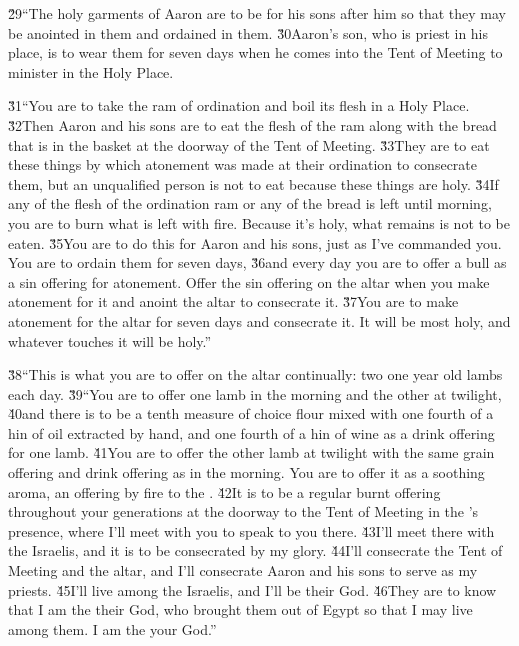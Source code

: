 \v{29}``The holy garments of Aaron are to be for his sons after him so that they may be anointed in them and ordained in them. \v{30}Aaron's son, who is priest in his place, is to wear them for seven days when he comes into the Tent of Meeting to minister in the Holy Place.

\v{31}``You are to take the ram of ordination and boil its flesh in a Holy Place. \v{32}Then Aaron and his sons are to eat the flesh of the ram along with the bread that is in the basket at the doorway of the Tent of Meeting. \v{33}They are to eat these things by which atonement was made at their ordination to consecrate them, but an unqualified person is not to eat because these things are holy. \v{34}If any of the flesh of the ordination ram or any of the bread is left until morning, you are to burn what is left with fire. Because it's holy, what remains is not to be eaten. \v{35}You are to do this for Aaron and his sons, just as I've commanded you. You are to ordain them for seven days, \v{36}and every day you are to offer a bull as a sin offering for atonement. Offer the sin offering on the altar when you make atonement for it and anoint the altar to consecrate it. \v{37}You are to make atonement for the altar for seven days and consecrate it. It will be most holy, and whatever touches it will be holy.''

\v{38}``This is what you are to offer on the altar continually: two one year old lambs each day. \v{39}``You are to offer one lamb in the morning and the other at twilight, \v{40}and there is to be a tenth measure of choice flour mixed with one fourth of a hin of oil extracted by hand, and one fourth of a hin of wine as a drink offering for one lamb. \v{41}You are to offer the other lamb at twilight with the same grain offering and drink offering as in the morning. You are to offer it as a soothing aroma, an offering by fire to the . \v{42}It is to be a regular burnt offering throughout your generations at the doorway to the Tent of Meeting in the 's presence, where I'll meet with you to speak to you there. \v{43}I'll meet there with the Israelis, and it is to be consecrated by my glory. \v{44}I'll consecrate the Tent of Meeting and the altar, and I'll consecrate Aaron and his sons to serve as my priests. \v{45}I'll live among the Israelis, and I'll be their God. \v{46}They are to know that I am the  their God, who brought them out of Egypt so that I may live among them. I am the  your God.''

